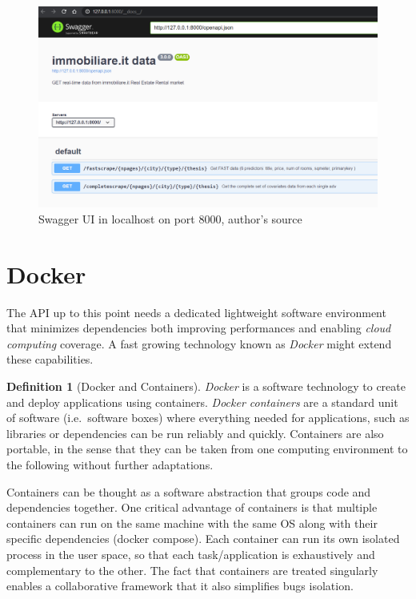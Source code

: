 \documentclass[
  12pt,
  a4paper,
  oneside]{book}
\theoremstyle{definition}
\newtheorem{definition}{Definition}[chapter]
\theoremstyle{definition}
\theoremstyle{definition}
\theoremstyle{remark}
\begin{document}
\begin{figure}
\centering
\includegraphics{images/swagger.PNG}
\caption{\label{fig:swagger}Swagger UI in localhost on port 8000, author's source}
\end{figure}

\hypertarget{docker}{%
\section{Docker}\label{docker}}

The API up to this point needs a dedicated lightweight software environment that minimizes dependencies both improving performances and enabling \emph{cloud computing} coverage. A fast growing technology known as \emph{Docker} might extend these capabilities.
\begin{definition}[Docker and Containers]
\protect\hypertarget{def:docker}{}{\label{def:docker} {} }\emph{Docker} \citep{docker} is a software technology to create and deploy applications using containers.
\emph{Docker containers} are a standard unit of software (i.e.~software boxes) where everything needed for applications, such as libraries or dependencies can be run reliably and quickly. Containers are also portable, in the sense that they can be taken from one computing environment to the following without further adaptations.
\end{definition}
Containers can be thought as a software abstraction that groups code and dependencies together. One critical advantage of containers is that multiple containers can run on the same machine with the same OS along with their specific dependencies (docker compose). Each container can run its own isolated process in the user space, so that each task/application is exhaustively and complementary to the other. The fact that containers are treated singularly enables a collaborative framework that it also simplifies bugs isolation.
\end{document}
